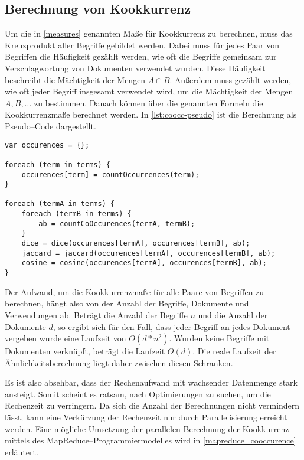 \subsection{Berechnung von Kookkurrenz}

Um die in \cref{measures} genannten Maße für Kookkurrenz zu berechnen, muss das Kreuzprodukt aller Begriffe gebildet werden. Dabei muss für jedes Paar von Begriffen die Häufigkeit gezählt werden, wie oft die Begriffe gemeinsam zur Verschlagwortung von Dokumenten verwendet wurden. Diese Häufigkeit beschreibt die Mächtigkeit der Mengen \(A \cap B\). Außerdem muss gezählt werden, wie oft jeder Begriff insgesamt verwendet wird, um die Mächtigkeit der Mengen \(A, B, \dots\) zu bestimmen. Danach können über die genannten Formeln die Kookkurrenzmaße berechnet werden. In \cref{lst:coocc-pseudo} ist die Berechnung als Pseudo--Code dargestellt.

\begin{lstlisting}[language=pseudo, label={lst:coocc-pseudo}, caption={Kookkurrenzberechnung}]
var occurences = {};

foreach (term in terms) {
    occurences[term] = countOccurrences(term);
}

foreach (termA in terms) {
    foreach (termB in terms) {
        ab = countCoOccurences(termA, termB);
    }
    dice = dice(occurences[termA], occurences[termB], ab);
    jaccard = jaccard(occurences[termA], occurences[termB], ab);
    cosine = cosine(occurences[termA], occurences[termB], ab);
}
\end{lstlisting}

Der Aufwand, um die Kookkurrenzmaße für alle Paare von Begriffen zu berechnen, hängt also von der Anzahl der Begriffe, Dokumente und Verwendungen ab. Beträgt die Anzahl der Begriffe \(n\) und die Anzahl der Dokumente \(d\), so ergibt sich für den Fall, dass jeder Begriff an jedes Dokument vergeben wurde eine Laufzeit von \(O(d*n^2)\). Wurden keine Begriffe mit Dokumenten verknüpft, beträgt die Laufzeit \(\Theta(d)\). Die reale Laufzeit der Ähnlichkeitsberechnung liegt daher zwischen diesen Schranken.

Es ist also absehbar, dass der Rechenaufwand mit wachsender Datenmenge stark ansteigt. Somit scheint es ratsam, nach Optimierungen zu suchen, um die Rechenzeit zu verringern. Da sich die Anzahl der Berechnungen nicht vermindern lässt, kann eine Verkürzung der Rechenzeit nur durch Parallelisierung erreicht werden. Eine mögliche Umsetzung der parallelen Berechnung der Kookkurrenz mittels des MapReduce--Programmiermodelles wird in \cref{mapreduce_cooccurence} erläutert.


